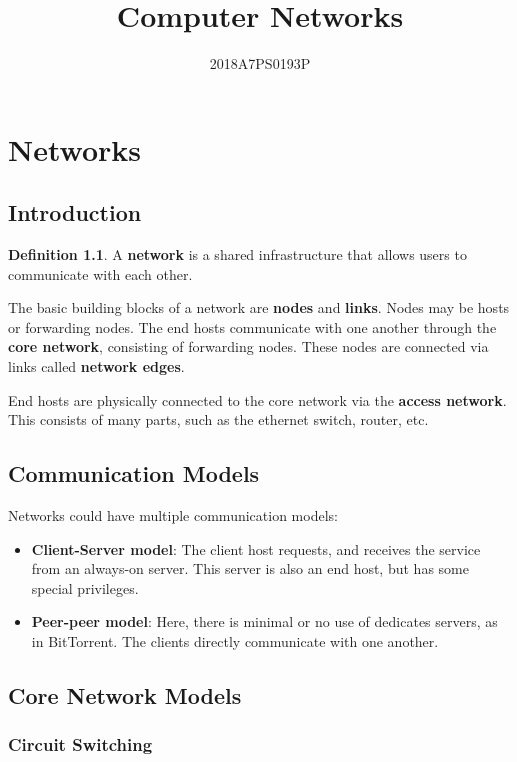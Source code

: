 \documentclass[12pt,letterpaper]{book}
\title{Computer Networks}
\author{2018A7PS0193P}
\theoremstyle{definition}
\newtheorem{definition}{Definition}[section] %
\begin{document}
\maketitle

\chapter{Networks}

\section{Introduction}

\begin{definition}
  A \textbf{network} is a shared infrastructure that allows users to communicate with each other.
\end{definition}

The basic building blocks of a network are \textbf{nodes} and \textbf{links}. Nodes may be hosts or forwarding nodes. The end hosts communicate with one another through the \textbf{core network}, consisting of forwarding nodes. These nodes are connected via links called \textbf{network edges}.

End hosts are physically connected to the core network via the \textbf{access network}. This consists of many parts, such as the ethernet switch, router, etc.

\section{Communication Models}

Networks could have multiple communication models:

\begin{itemize}
  \item \textbf{Client-Server model}: The client host requests, and receives the service from an always-on server. This server is also an end host, but has some special privileges.
  \item \textbf{Peer-peer model}: Here, there is minimal or no use of dedicates servers, as in BitTorrent. The clients directly communicate with one another.
\end{itemize}

\section{Core Network Models}

\subsection{Circuit Switching}
\end{document}
